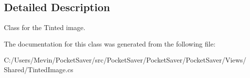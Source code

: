 \subsection{Detailed Description}
Class for the Tinted image. 



The documentation for this class was generated from the following file\+:\begin{DoxyCompactItemize}
\item 
C\+:/\+Users/\+Mevin/\+Pocket\+Saver/src/\+Pocket\+Saver/\+Pocket\+Saver/\+Pocket\+Saver/\+Views/\+Shared/Tinted\+Image.\+cs\end{DoxyCompactItemize}
